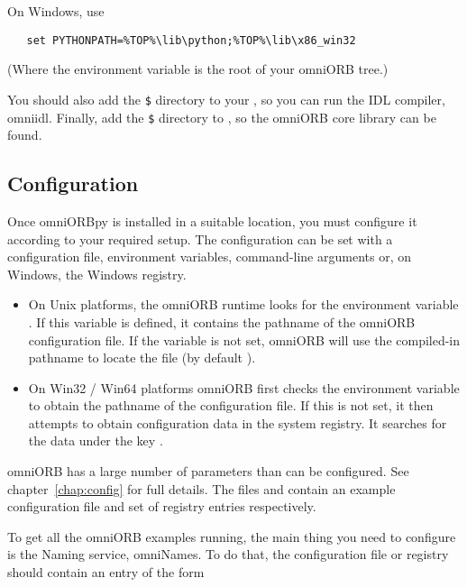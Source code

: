 \documentclass[11pt,oneside,a4paper]{book}
\begin{document}
On Windows, use

\begin{verbatim}
   set PYTHONPATH=%TOP%\lib\python;%TOP%\lib\x86_win32
\end{verbatim}

(Where the  environment variable is the root of your
omniORB tree.)

You should also add the \texttt{\$} directory
to your , so you can run the IDL compiler, omniidl.
Finally, add the \texttt{\$} directory to
, so the omniORB core library can be found.


\subsection{Configuration}

Once omniORBpy is installed in a suitable location, you must configure
it according to your required setup. The configuration can be set with
a configuration file, environment variables, command-line arguments
or, on Windows, the Windows registry.

\begin{itemize}

\item On Unix platforms, the omniORB runtime looks for the environment
  variable . If this variable is defined, it
  contains the pathname of the omniORB configuration file. If the
  variable is not set, omniORB will use the compiled-in pathname to
  locate the file (by default ).

\item On Win32 / Win64 platforms omniORB first checks the environment
  variable  to obtain the pathname of the
  configuration file. If this is not set, it then attempts to obtain
  configuration data in the system registry. It searches for the data
  under the key .

\end{itemize}

omniORB has a large number of parameters than can be configured. See
chapter~\ref{chap:config} for full details. The files
 and  contain an example
configuration file and set of registry entries respectively.

To get all the omniORB examples running, the main thing you need to
configure is the Naming service, omniNames. To do that, the
configuration file or registry should contain an entry of the form
\end{document}
